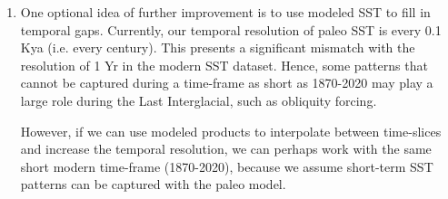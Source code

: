 \documentclass{article}
\begin{document}
\begin{enumerate}
    \item One optional idea of further improvement is to use modeled SST to fill in temporal gaps. Currently, our temporal resolution of paleo SST is every 0.1 Kya (i.e. every century). This presents a significant mismatch with the resolution of 1 Yr in the modern SST dataset. Hence, some patterns that cannot be captured during a time-frame as short as 1870-2020 may play a large role during the Last Interglacial, such as obliquity forcing. 
    
    However, if we can use modeled products to interpolate between time-slices and increase the temporal resolution, we can perhaps work with the same short modern time-frame (1870-2020), because we assume short-term SST patterns can be captured with the paleo model.
    
\end{enumerate}
\end{document}
